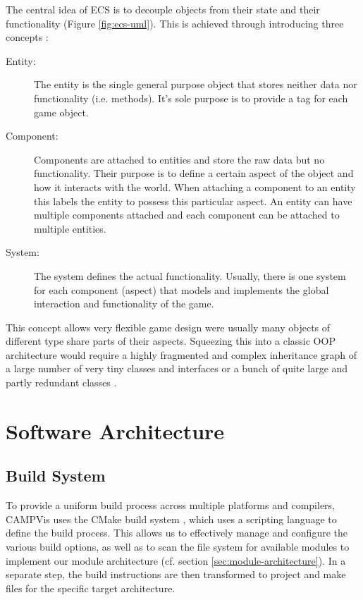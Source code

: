 The central idea of ECS is to decouple objects from their state and their functionality (Figure \ref{fig:ecs-uml}).
This is achieved through introducing three concepts \cite{Martin09}:
\begin{description}
	\item[Entity:]
	The entity is the single general purpose object that stores neither data nor functionality (i.e. methods).
	It's sole purpose is to provide a tag for each game object.
	
	\item[Component:]
	Components are attached to entities and store the raw data but no functionality. 
	Their purpose is to define a certain aspect of the object and how it interacts with the world.
	When attaching a component to an entity this labels the entity to possess this particular aspect.
	An entity can have multiple components attached and each component can be attached to multiple entities.
	
	\item[System:]
	The system defines the actual functionality.
	Usually, there is one system for each component (aspect) that models and implements the global interaction and functionality of the game.
\end{description}

This concept allows very flexible game design were usually many objects of different type share parts of their aspects.
Squeezing this into a classic OOP architecture would require a highly fragmented and complex inheritance graph of a large number of very tiny classes and interfaces or a bunch of quite large and partly redundant classes \cite{mcshaffry2003game}.


\section{Software Architecture}
\label{sec:architecture}

\subsection{Build System}
To provide a uniform build process across multiple platforms and compilers, CAMPVis uses the CMake build system \cite{CMake}, which uses a scripting language to define the build process.
This allows us to effectively manage and configure the various build options, as well as to scan the file system for available modules to implement our module architecture (cf. section \ref{sec:module-architecture}).
In a separate step, the build instructions are then transformed to project and make files for the specific target architecture.


